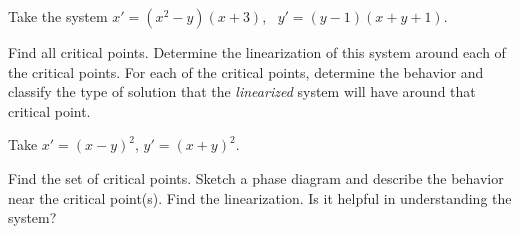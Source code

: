 \documentclass{ximera}
\begin{document}
\begin{exercise}
    Take the system $x' = (x^2 - y)(x+3)$, \ $y' = (y-1)(x+y+1)$.
    \begin{tasks}
        \task Find all critical points.
        \task Determine the linearization of this system around each of the critical points.
        \task For each of the critical points, determine the behavior and classify the type of solution that the \emph{linearized} system will have around that critical point. 
    \end{tasks}
\end{exercise}

\begin{exercise}
    Take $x'=(x-y)^2$, \enspace $y'=(x+y)^2$. 
    \begin{tasks}
        \task Find the set of critical points.
        \task Sketch a phase diagram and describe the behavior near the critical point(s).
        \task Find the linearization.  Is it helpful in understanding the system?
    \end{tasks}
\end{exercise}
\end{document}
